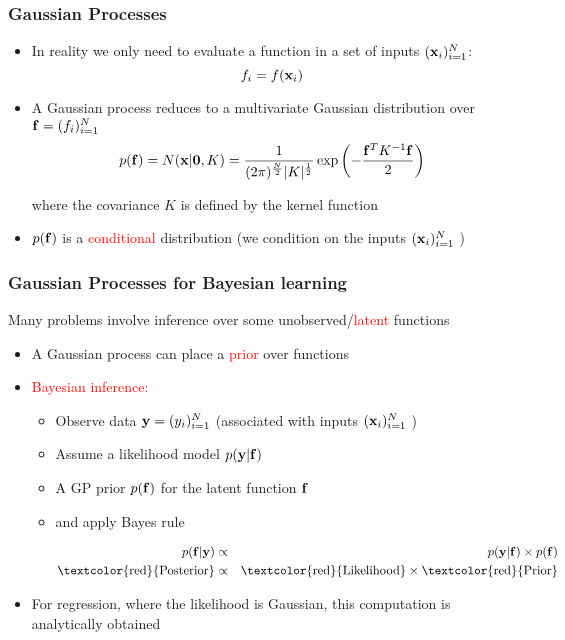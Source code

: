 \documentclass{beamer}
\begin{document}
\frame
{

\frametitle{Gaussian Processes }
\begin{itemize}

  \item In reality we only need to evaluate a function in  
         a set of inputs $(\mathbf{x}_i)_{i=1}^N$: 
$$
f_i = f(\mathbf{x}_i)
$$                    
  \item A Gaussian process reduces to a multivariate Gaussian distribution 
            over $\mathbf{f}=(f_i)_{i=1}^N$
               $$
               p(\mathbf{f}) = N(\mathbf{x}|\mathbf{0},K) =
               \frac{1}{(2\pi)^{\frac{N}{2}} |K|^{\frac{1}{2}}} 
               \exp\left( - \frac{\mathbf{f}^T K^{-1} \mathbf{f}}{2} \right)   
               $$    

where the covariance $K$ is defined by the kernel function

   \item  $p(\mathbf{f})$ is a \textcolor{red}{conditional} distribution 
          (we condition on the inputs $(\mathbf{x}_i)_{i=1}^N$ )  
  \end{itemize}
}


\frame
{
  \frametitle{Gaussian Processes for Bayesian learning}

Many problems involve inference over some unobserved/\textcolor{red}{latent} functions 

  \begin{itemize}
  \item A Gaussian process can place a \textcolor{red}{prior} 
            over functions 

\item \textcolor{red}{Bayesian inference:}

\begin{itemize}

\item Observe data $\mathbf{y}=(y_i)_{i=1}^N$ (associated with inputs $(\mathbf{x}_i)_{i=1}^N$ )

\item Assume a likelihood model $p(\mathbf{y}|\mathbf{f})$

\item A GP prior $p(\mathbf{f})$ for the latent function $\mathbf{f}$

\item and apply Bayes rule 

\begin{eqnarray}
p(\bff|\bfy) & \propto &  p(\bfy|\bff) \times p(\bff) \nonumber \\
\text{\textcolor{red}{Posterior}} & \propto & \text{\textcolor{red}{Likelihood}}
\times \text{\textcolor{red}{Prior}} \nonumber
\end{eqnarray}

\end{itemize}


\item For regression, where the likelihood is Gaussian, this
  computation is analytically obtained 
    
\end{itemize}

}
\end{document}
